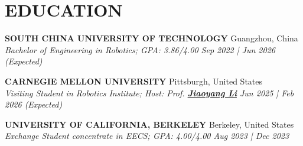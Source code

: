 \documentclass[a4paper,9pt]{extarticle}
\begin{document}
\section*{{\textbf{\fontsize{14pt}{8pt}\selectfont E}\textbf{\scshape DUCATION}}}
\textbf{SOUTH CHINA UNIVERSITY OF TECHNOLOGY} \hfill Guangzhou, China\\ %
\textit{Bachelor of Engineering in Robotics; GPA: 3.86/4.00  \hfill Sep 2022 | Jun 2026 (Expected)} %
\par\vspace{4pt}\noindent
\textbf{CARNEGIE MELLON UNIVERSITY} \hfill Pittsburgh, United States \\ %
\textit{Visiting Student in Robotics Institute; Host: Prof. {\href{https://jiaoyangli.me/}{\textbf{Jiaoyang Li}}}  \hfill Jun 2025 | Feb 2026 (Expected)}  %
\par\vspace{4pt}\noindent
\textbf{UNIVERSITY OF CALIFORNIA, BERKELEY} \hfill Berkeley, United States\\ %
\textit{Exchange Student concentrate in EECS; GPA: 4.00/4.00 \hfill   Aug 2023 | Dec 2023} %



\end{document}
